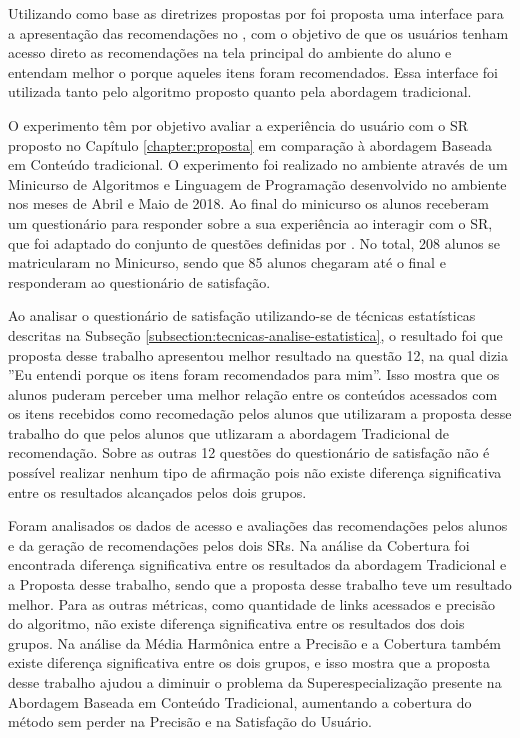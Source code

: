 Utilizando como base as diretrizes propostas por  foi proposta uma interface para a apresentação das recomendações no \adaptweb,
com o objetivo de que os usuários tenham acesso direto as recomendações na tela principal do ambiente do aluno e entendam
melhor o porque aqueles itens foram recomendados. Essa interface foi utilizada tanto pelo algoritmo proposto
quanto pela abordagem tradicional.

O experimento têm por objetivo avaliar a experiência do usuário com o SR proposto no Capítulo \ref{chapter:proposta} em
comparação à abordagem Baseada em Conteúdo tradicional. O experimento foi realizado no ambiente
\adaptweb através de um Minicurso de Algoritmos e Linguagem de Programação desenvolvido no ambiente nos meses de
Abril e Maio de 2018. Ao final do minicurso os alunos receberam um questionário para responder sobre a sua experiência
ao interagir com o SR, que foi adaptado do conjunto de questões definidas por . No total, 208 alunos
se matricularam no Minicurso, sendo que 85 alunos chegaram até o final e responderam ao questionário de satisfação.

Ao analisar o questionário de satisfação utilizando-se de técnicas estatísticas descritas na Subseção \ref{subsection:tecnicas-analise-estatistica},
o resultado foi que proposta desse trabalho apresentou melhor resultado na questão 12, na qual dizia
''Eu entendi porque os itens foram recomendados para mim''. Isso mostra que os alunos puderam perceber uma melhor relação
entre os conteúdos acessados com os itens recebidos como recomedação pelos alunos que utilizaram a proposta desse trabalho
do que pelos alunos que utlizaram a abordagem Tradicional de recomendação. Sobre as outras 12 questões do questionário de
satisfação não é possível realizar nenhum tipo de afirmação pois não existe diferença significativa entre os resultados
alcançados pelos dois grupos.

Foram analisados os dados de acesso e avaliações das recomendações pelos alunos e da geração de recomendações pelos dois
SRs. Na análise da Cobertura foi encontrada diferença significativa entre os resultados
da abordagem Tradicional e a Proposta desse trabalho, sendo que a proposta desse trabalho teve um resultado melhor. Para as
outras métricas, como quantidade de links acessados e precisão do algoritmo, não existe diferença significativa entre os resultados
dos dois grupos. Na análise da Média Harmônica entre a Precisão e a Cobertura também existe diferença significativa
entre os dois grupos, e isso mostra que a proposta desse trabalho ajudou a diminuir o problema da Superespecialização presente na Abordagem Baseada em Conteúdo Tradicional,
aumentando a cobertura do método sem perder na Precisão e na Satisfação do Usuário.

